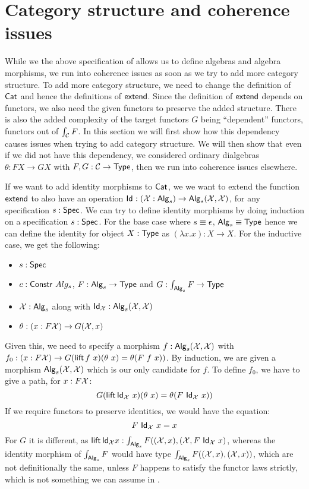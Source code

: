 \documentclass[a4paper,10pt]{report}
\begin{document}

\section{Category structure and coherence issues}
\label{sec:hitscategory}

While we the above specification of \hits allows us to define algebras
and algebra morphisms, we run into coherence issues as soon as we try
to add more category structure. To add more category structure, we
need to change the definition of $\mathsf{Cat}$ and hence the definitions of
$\mathsf{extend}$. Since the definition of $\mathsf{extend}$ depends on functors, we
also need the given functors to preserve the added structure. There is
also the added complexity of the target functors $G$ being
``dependent'' functors, \ie functors out of $\int_{\mathcal{C}} F$. In this
section we will first show how this dependency causes issues when
trying to add category structure. We will then show that even if we
did not have this dependency, \ie we considered ordinary dialgebras
$\theta : F X \to G X$ with $F, G : \mathcal{C} \to \mathsf{Type}$, then we run into
coherence issues elsewhere.

If we want to add identity morphisms to $\mathsf{Cat}$, we we want to extend
the function $\mathsf{extend}$ to also have an operation
$\mathsf{Id}_{} : (\mathcal{X} : \mathsf{Alg}_s) \to \mathsf{Alg}_s(\mathcal{X},\mathcal{X})$, for any
specification $s : \mathsf{Spec}$. We can try to define identity morphisms by
doing induction on a specification $s : \mathsf{Spec}$. For the base case
where $s \equiv \epsilon$, $\mathsf{Alg}_s \equiv \mathsf{Type}$ hence we can define
the identity for object $X : \mathsf{Type}$ as $(\lambda x . x) : X \to X$. For
the inductive case, we get the following:
%
\begin{itemize}
\item $s : \mathsf{Spec}$ 
\item $c : \mathsf{Constr}\ Alg_s$, \ie $F : \mathsf{Alg}_s \to \mathsf{Type}$ and $G : \int_{\mathsf{Alg}_s} F \to \mathsf{Type}$
\item $\mathcal{X} : \mathsf{Alg}_s$ along with
  $\mathsf{Id}_{\mathcal{X}} : \mathsf{Alg}_s (\mathcal{X},\mathcal{X})$
\item  $\theta : (x : F \mathcal{X}) \to G (\mathcal{X}, x)$
\end{itemize}
%
Given this, we need to specify a morphism
$f : \mathsf{Alg}_s (\mathcal{X},\mathcal{X})$ with
$f_0 : (x : F \alg{X}) \to G (\lift f\ x) (\theta\ x) = \theta (F\ f\
x))$.
By induction, we are given a morphism $\mathsf{Alg}_s (\mathcal{X},\mathcal{X})$ which
is our only candidate for $f$. To define $f_0$, we have to give a path, for $x : F \mathcal{X}$:
$$
G (\operatorname{\mathsf{lift}} \mathsf{Id}_{\mathcal{X}}\ x) (\theta\ x) = \theta (F\ \mathsf{Id}_{\mathcal{X}}\ x))
$$
If we require functors to preserve identities, we would have the equation:
$$
F\ \mathsf{Id}_{\mathcal{X}}\ x = x
$$
For $G$ it is different, as
$\operatorname{\mathsf{lift}} \mathsf{Id}_{\mathcal{X}} x : \int_{\mathsf{Alg}_s} F ((\mathcal{X},x), (\mathcal{X}, F\
\mathsf{Id}_{\mathcal{X}}\ x)$,
whereas the identity morphism of $\int_{\mathsf{Alg}_s} F$ would have type
$\int_{\mathsf{Alg}_s} F ((\mathcal{X},x),(\mathcal{X},x))$, which are not
definitionally the same, unless $F$ happens to satisfy the functor
laws strictly, which is not something we can assume in \mltt.
\end{document}
